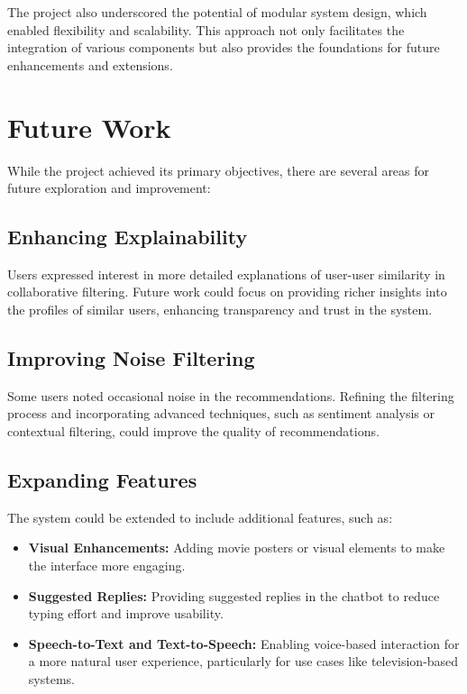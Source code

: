 The project also underscored the potential of modular system design, which enabled flexibility and scalability. This approach not only facilitates the integration of various components but also provides the foundations for future enhancements and extensions.




\section{Future Work}
\label{sec:future_work}
While the project achieved its primary objectives, there are several areas for future exploration and improvement:

\subsection{Enhancing Explainability}
Users expressed interest in more detailed explanations of user-user similarity in collaborative filtering. Future work could focus on providing richer insights into the profiles of similar users, enhancing transparency and trust in the system.

\subsection{Improving Noise Filtering}
Some users noted occasional noise in the recommendations. Refining the filtering process and incorporating advanced techniques, such as sentiment analysis or contextual filtering, could improve the quality of recommendations.

\subsection{Expanding Features}
The system could be extended to include additional features, such as:
\begin{itemize}
    \item \textbf{Visual Enhancements:} Adding movie posters or visual elements to make the interface more engaging.
    \item \textbf{Suggested Replies:} Providing suggested replies in the chatbot to reduce typing effort and improve usability.
    \item \textbf{Speech-to-Text and Text-to-Speech:} Enabling voice-based interaction for a more natural user experience, particularly for use cases like television-based systems.
\end{itemize}

